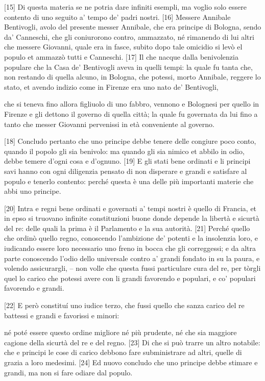 {[}15{]} Di questa materia se ne potria dare infiniti esempli, ma voglio
solo essere contento di uno seguito a' tempo de' padri nostri. {[}16{]}
Messere Annibale Bentivogli, avolo del presente messer Annibale, che era
principe di Bologna, sendo da' Canneschi, che gli coniurorono contro,
ammazzato, né rimanendo di lui altri che messere Giovanni, quale era in
fasce, subito dopo tale omicidio si levò el populo et ammazzò tutti e
Canneschi. {[}17{]} Il che nacque dalla benivolenzia populare che la
Casa de' Bentivogli aveva in quelli tempi: la quale fu tanta che, non
restando di quella alcuno, in Bologna, che potessi, morto Annibale,
reggere lo stato, et avendo indizio come in Firenze era uno nato de'
Bentivogli,

\quebra

\noindent{}che si teneva fino allora figliuolo di uno fabbro, vennono e
Bolognesi per quello in Firenze e gli dettono il governo di quella
città; la quale fu governata da lui fino a tanto che messer Giovanni
pervenissi in età conveniente al governo.

{[}18{]} Concludo pertanto che uno principe debbe tenere delle congiure
poco conto, quando il popolo gli sia benivolo: ma quando gli sia nimico
et abbilo in odio, debbe temere d'ogni cosa e d'ognuno. {[}19{]} E gli
stati bene ordinati e li principi savi hanno con ogni diligenzia pensato
di non disperare e grandi e satisfare al populo e tenerlo contento:
perché questa è una delle più importanti materie che abbi uno principe.

{[}20{]} Intra e regni bene ordinati e governati a' tempi nostri è
quello di Francia, et in epso si truovano infinite constituzioni buone
donde depende la libertà e sicurtà del re: delle quali la prima è il
Parlamento e la sua autorità. {[}21{]} Perché quello che ordinò quello
regno, conoscendo l'ambizione de' potenti e la insolenzia loro, e
iudicando essere loro necessario uno freno in bocca che gli correggessi;
e da altra parte conoscendo l'odio dello universale contro a' grandi
fondato in su la paura, e volendo assicurargli, -- non volle che questa
fussi particulare cura del re, per tòrgli quel lo carico che potessi
avere con li grandi favorendo e populari, e co' populari favorendo e
grandi.

{[}22{]} E però constituí uno iudice terzo, che fussi quello che sanza
carico del re battessi e grandi e favorissi e minori:

\quebra

\noindent{}né poté essere
questo ordine migliore né più prudente, né che sia maggiore cagione
della sicurtà del re e del regno. {[}23{]} Di che si può trarre un altro
notabile: che e principi le cose di carico debbono fare subministrare ad
altri, quelle di grazia a loro medesimi. {[}24{]} Ed nuovo concludo che
uno principe debbe stimare e grandi, ma non si fare odiare dal populo.

